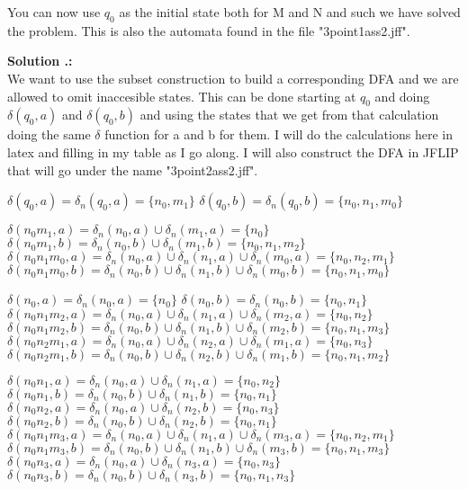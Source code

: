 \documentclass{article}
\newcounter{problem}
\newcounter{solution}
\newcommand\ASolution{%
  \stepcounter{solution}%
  \textbf{Solution \theproblem.\thesolution:}\\%
}
\begin{document}
You can now use $q_0$ as the initial state both for M and N and such we 
have solved the problem. This is also the automata found in the file "3point1ass2.jff".
 
\ASolution We want to use the subset construction to build a 
corresponding DFA and we are allowed to omit inaccesible 
states. This can be done starting at $q_0$ and doing $\delta (q_0, a)$ and $\delta (q_0, 
b)$ and using the states that we get from that calculation doing the same $\delta$ 
function for a and b for them. I will do the calculations here in latex and filling in my 
table as I go along. I will also construct the DFA in JFLIP that will go under the name 
"3point2ass2.jff".

$\delta (q_0, a) = \delta_n (q_0,a) = \{n_0, m_1\}$ \newline
$\delta (q_0, b) = \delta_n (q_0,b) = \{n_0, n_1, m_0\}$

$\delta (n_0m_1, a) = \delta_n (n_0,a) \cup \delta_n (m_1,a) = \{n_0\}$ \newline
$\delta (n_0m_1, b) = \delta_n (n_0,b) \cup \delta_n (m_1,b) = \{n_0,n_1,m_2\}$ \newline
$\delta (n_0n_1m_0, a) = \delta_n (n_0,a) \cup \delta_n (n_1,a) \cup \delta_n (m_0,a) = 
\{n_0, n_2, m_1\}$ \newline
$\delta (n_0n_1m_0, b) = \delta_n (n_0,b) \cup \delta_n (n_1,b) \cup \delta_n (m_0,
b) = \{n_0, n_1, m_0\}$

$\delta (n_0, a) = \delta_n (n_0, a) = \{n_0\}$\newline
$\delta (n_0, b) = \delta_n (n_0, b) = \{n_0, n_1\}$\newline
$\delta (n_0n_1m_2, a) = \delta_n (n_0,a) \cup \delta_n (n_1,a) \cup \delta_n (m_2,
a) = \{n_0, n_2\}$ \newline
$\delta (n_0n_1m_2, b) = \delta_n (n_0,b) \cup \delta_n (n_1,b) \cup \delta_n (m_2,b) = 
\{n_0, n_1, m_3\}$ \newline
$\delta (n_0n_2m_1, a) = \delta_n (n_0,a) \cup \delta_n (n_2, a) \cup \delta_n (m_1,
a) = \{n_0, n_3\}$ \newline
$\delta (n_0n_2m_1, b) = \delta_n (n_0,b) \cup \delta_n (n_2,b) \cup \delta_n (m_1,
b) = \{n_0, n_1, m_2\}$

$\delta (n_0n_1, a) = \delta_n (n_0,a) \cup \delta_n (n_1,a) = \{n_0, n_2\}$ \newline
$\delta (n_0n_1, b) = \delta_n (n_0,b) \cup \delta_n (n_1,b) = \{n_0, n_1\}$ \newline
$\delta (n_0n_2, a) = \delta_n (n_0,a) \cup \delta_n (n_2,b) = \{n_0, n_3\}$ \newline
$\delta (n_0n_2, b) = \delta_n (n_0,b) \cup \delta_n (n_2,b) = \{n_0, n_1\}$ \newline
$\delta (n_0n_1m_3, a) = \delta_n (n_0,a) \cup \delta_n (n_1,a) \cup \delta_n (m_3,a) = 
\{n_0, n_2, m_1\}$ \newline
$\delta (n_0n_1m_3, b) = \delta_n (n_0,b) \cup \delta_n (n_1,b) \cup \delta_n (m_3,b) = 
\{n_0, n_1, m_3\}$ \newline
$\delta (n_0n_3, a) = \delta_n (n_0,a) \cup \delta_n (n_3,a) = \{n_0, n_3\}$ \newline
$\delta (n_0n_3, b) = \delta_n (n_0,b) \cup \delta_n (n_3,b) = \{n_0, n_1, n_3\}$
\end{document}
